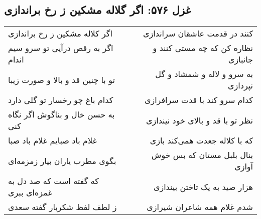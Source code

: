 \begin{center}
\section*{غزل ۵۷۶: اگر گلاله مشکین ز رخ براندازی}
\label{sec:576}
\begin{longtable}{l p{0.5cm} r}
اگر کلاله مشکین ز رخ براندازی
&&
کنند در قدمت عاشقان سراندازی
\\
اگر به رقص درآیی تو سرو سیم اندام
&&
نظاره کن که چه مستی کنند و جانبازی
\\
تو با چنین قد و بالا و صورت زیبا
&&
به سرو و لاله و شمشاد و گل نپردازی
\\
کدام باغ چو رخسار تو گلی دارد
&&
کدام سرو کند با قدت سرافرازی
\\
به حسن خال و بناگوش اگر نگاه کنی
&&
نظر تو با قد و بالای خود نیندازی
\\
غلام باد صبایم غلام باد صبا
&&
که با کلاله جعدت همی‌کند بازی
\\
بگوی مطرب یاران بیار زمزمه‌ای
&&
بنال بلبل مستان که بس خوش آوازی
\\
که گفته است که صد دل به غمزه‌ای ببری
&&
هزار صید به یک تاختن بیندازی
\\
ز لطف لفظ شکربار گفته سعدی
&&
شدم غلام همه شاعران شیرازی
\\
\end{longtable}
\end{center}
